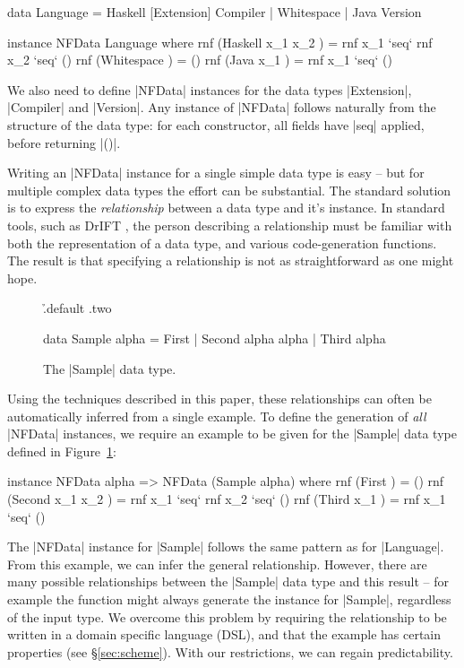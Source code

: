 \documentclass[preprint,draft]{sigplanconf}
\begin{document}
\begin{code}
data Language  =  Haskell [Extension] Compiler
               |  Whitespace
               |  Java Version

instance NFData Language where
    rnf (Haskell x_1 x_2  ) = rnf x_1 `seq` rnf x_2 `seq` ()
    rnf (Whitespace       ) = ()
    rnf (Java x_1         ) = rnf x_1 `seq` ()
\end{code}

We also need to define |NFData| instances for the data types |Extension|, |Compiler| and |Version|. Any instance of |NFData| follows naturally from the structure of the data type: for each constructor, all fields have |seq| applied, before returning |()|.

Writing an |NFData| instance for a single simple data type is easy -- but for multiple complex data types the effort can be substantial. The standard solution is to express the \textit{relationship} between a data type and it's instance. In standard tools, such as DrIFT \cite{drift}, the person describing a relationship must be familiar with both the representation of a data type, and various code-generation functions. The result is that specifying a relationship is not as straightforward as one might hope.

\begin{figure}
\h{.default .two}\begin{code}
data Sample alpha  =  First
                   |  Second  alpha alpha
                   |  Third   alpha
\end{code}
\caption{The |Sample| data type.}
\label{fig:sample}
\end{figure}

Using the techniques described in this paper, these relationships can often be automatically inferred from a single example. To define the generation of \textit{all} |NFData| instances, we require an example to be given for the |Sample| data type defined in Figure~\ref{fig:sample}:

\begin{code}
instance NFData alpha => NFData (Sample alpha) where
    rnf (First           ) = ()
    rnf (Second x_1 x_2  ) = rnf x_1 `seq` rnf x_2 `seq` ()
    rnf (Third x_1       ) = rnf x_1 `seq` ()
\end{code}

The |NFData| instance for |Sample| follows the same pattern as for |Language|. From this example, we can infer the general relationship. However, there are many possible relationships between the |Sample| data type and this result -- for example the function might always generate the instance for |Sample|, regardless of the input type. We overcome this problem by requiring the relationship to be written in a domain specific language (DSL), and that the example has certain properties (see \S\ref{sec:scheme}). With our restrictions, we can regain predictability.
\end{document}
